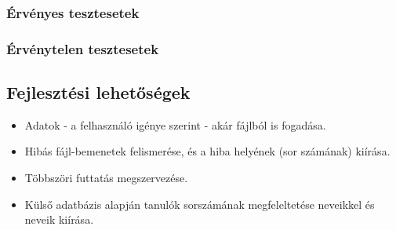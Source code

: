 \documentclass[a4paper]{article}
\begin{document}
      \subsubsection{Érvényes tesztesetek}
      \subsubsection{Érvénytelen tesztesetek}
    \subsection{Fejlesztési lehetőségek}
      \begin{itemize}
        \item Adatok - a felhasználó igénye szerint - akár fájlból is fogadása.
        \item Hibás fájl-bemenetek felismerése, és a hiba helyének (sor számának) kiírása.
        \item Többszöri futtatás megszervezése.
        \item Külső adatbázis alapján tanulók sorszámának megfeleltetése neveikkel és neveik kiírása.
      \end{itemize}
\end{document}
